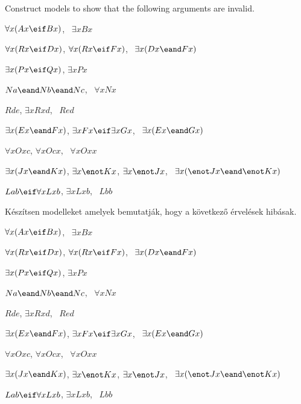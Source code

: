 \problempart
Construct models to show that the following arguments are invalid.
\begin{earg}
\item $\forall x(Ax \eif Bx)$, \therefore\ $\exists x Bx$
\item $\forall x(Rx \eif Dx)$, $\forall x(Rx \eif Fx)$, \therefore\ $\exists x(Dx \eand Fx)$
\item $\exists x(Px\eif Qx)$, \therefore $\exists x Px$
\item $Na \eand Nb \eand Nc$, \therefore\ $\forall x Nx$
\item $Rde$, $\exists x Rxd$, \therefore\ $Red$
\item $\exists x(Ex \eand Fx)$, $\exists x Fx \eif \exists x Gx$, \therefore\ $\exists x(Ex \eand Gx)$
\item $\forall x Oxc$, $\forall x Ocx$, \therefore\ $\forall x Oxx$
\item $\exists x(Jx \eand Kx)$, $\exists x \enot Kx$, $\exists x \enot Jx$, \therefore\ $\exists x(\enot Jx \eand \enot Kx)$
\item $Lab \eif \forall x Lxb$, $\exists x Lxb$, \therefore\ $Lbb$
\end{earg}
\problempart
Készítsen modelleket amelyek bemutatják, hogy a következő érvelések hibásak.
\begin{earg}
\item $\forall x(Ax \eif Bx)$, \therefore\ $\exists x Bx$
\item $\forall x(Rx \eif Dx)$, $\forall x(Rx \eif Fx)$, \therefore\ $\exists x(Dx \eand Fx)$
\item $\exists x(Px\eif Qx)$, \therefore $\exists x Px$
\item $Na \eand Nb \eand Nc$, \therefore\ $\forall x Nx$
\item $Rde$, $\exists x Rxd$, \therefore\ $Red$
\item $\exists x(Ex \eand Fx)$, $\exists x Fx \eif \exists x Gx$, \therefore\ $\exists x(Ex \eand Gx)$
\item $\forall x Oxc$, $\forall x Ocx$, \therefore\ $\forall x Oxx$
\item $\exists x(Jx \eand Kx)$, $\exists x \enot Kx$, $\exists x \enot Jx$, \therefore\ $\exists x(\enot Jx \eand \enot Kx)$
\item $Lab \eif \forall x Lxb$, $\exists x Lxb$, \therefore\ $Lbb$
\end{earg}




